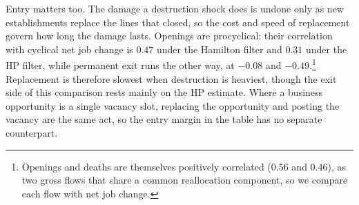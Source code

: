 \documentclass[authoryear, review, 12pt]{elsarticle}
\begin{document}
	Entry matters too. The damage a destruction shock does is undone only as new
	establishments replace the lines that closed, so the cost and speed of replacement govern
	how long the damage lasts. Openings are procyclical: their correlation with cyclical net
	job change is $0.47$ under the Hamilton filter and $0.31$ under the HP filter, while
	permanent exit runs the other way, at $-0.08$ and $-0.49$.\footnote{Openings and deaths are
	themselves positively correlated ($0.56$ and $0.46$), as two gross flows that share a
	common reallocation component, so we compare each flow with net job change.} Replacement
	is therefore slowest when destruction is heaviest, though the exit side of this comparison
	rests mainly on the HP estimate. Where a business opportunity is a single vacancy slot,
	replacing the opportunity and posting the vacancy are the same act, so the entry margin
	in the table has no separate counterpart.
\end{document}
